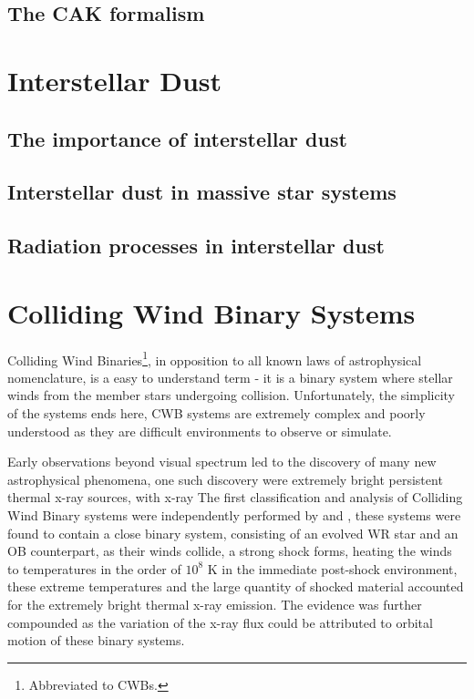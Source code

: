 \subsection{The CAK formalism}
\label{sec:cak}

\section{Interstellar Dust}
\label{sec:dust}

\subsection{The importance of interstellar dust}
\label{sec:dustimportance}

\subsection{Interstellar dust in massive star systems}
\label{sec:dustmassivestars}

\subsection{Radiation processes in interstellar dust}
\label{sec:dustcooling-background}

\section{Colliding Wind Binary Systems}
\label{sec:cwb}



Colliding Wind Binaries\footnote{Abbreviated to CWBs.}, in opposition to all known laws of astrophysical nomenclature, is a easy to understand term - it is a binary system where stellar winds from the member stars undergoing collision.
Unfortunately, the simplicity of the systems ends here, CWB systems are extremely complex and poorly understood as they are difficult environments to observe or simulate.


Early observations beyond visual spectrum led to the discovery of many new astrophysical phenomena, one such discovery were extremely bright persistent thermal x-ray sources, with x-ray 
The first classification and analysis of Colliding Wind Binary systems were independently performed by \cite{prilutskii_x_1976} and \cite{cherepashchukDetectabilityWolfRayetBinaries1976}, these systems were found to contain a close binary system, consisting of an evolved WR star and an OB counterpart, as their winds collide, a strong shock forms, heating the winds to temperatures in the order of $10^8$ \si{\kelvin} in the immediate post-shock environment, these extreme temperatures and the large quantity of shocked material accounted for the extremely bright thermal x-ray emission. The evidence was further compounded as the variation of the x-ray flux could be attributed to orbital motion of these binary systems.

